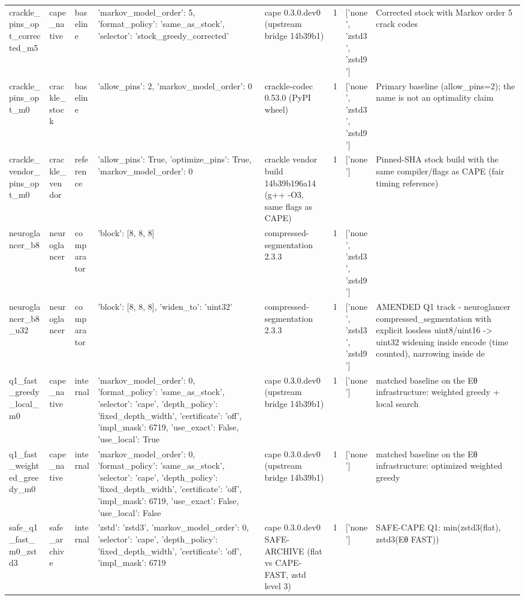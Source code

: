 \begin{table}[t]
\begin{tabular}{llllllll}
crackle\_pins\_opt\_corrected\_m5 & cape\_native & baseline & {'markov\_model\_order': 5, 'format\_policy': 'same\_as\_stock', 'selector': 'stock\_greedy\_corrected'} & cape 0.3.0.dev0 (upstream bridge 14b39b1) & 1 & ['none', 'zstd3', 'zstd9'] & Corrected stock with Markov order 5 crack codes \\
crackle\_pins\_opt\_m0 & crackle\_stock & baseline & {'allow\_pins': 2, 'markov\_model\_order': 0} & crackle-codec 0.53.0 (PyPI wheel) & 1 & ['none', 'zstd3', 'zstd9'] & Primary baseline (allow\_pins=2); the name is not an optimality claim \\
crackle\_vendor\_pins\_opt\_m0 & crackle\_vendor & reference & {'allow\_pins': True, 'optimize\_pins': True, 'markov\_model\_order': 0} & crackle vendor build 14b39b196a14 (g++ -O3, same flags as CAPE) & 1 & ['none'] & Pinned-SHA stock build with the same compiler/flags as CAPE (fair timing reference) \\
neuroglancer\_b8 & neuroglancer & comparator & {'block': [8, 8, 8]} & compressed-segmentation 2.3.3 & 1 & ['none', 'zstd3', 'zstd9'] &  \\
neuroglancer\_b8\_u32 & neuroglancer & comparator & {'block': [8, 8, 8], 'widen\_to': 'uint32'} & compressed-segmentation 2.3.3 & 1 & ['none', 'zstd3', 'zstd9'] & AMENDED Q1 track - neuroglancer compressed\_segmentation with explicit lossless uint8/uint16 -> uint32 widening inside encode (time counted), narrowing inside de \\
q1\_fast\_greedy\_local\_m0 & cape\_native & internal & {'markov\_model\_order': 0, 'format\_policy': 'same\_as\_stock', 'selector': 'cape', 'depth\_policy': 'fixed\_depth\_width', 'certificate': 'off', 'impl\_mask': 6719, 'use\_exact': False, 'use\_local': True} & cape 0.3.0.dev0 (upstream bridge 14b39b1) & 1 & ['none'] & matched baseline on the Eθ infrastructure: weighted greedy + local search \\
q1\_fast\_weighted\_greedy\_m0 & cape\_native & internal & {'markov\_model\_order': 0, 'format\_policy': 'same\_as\_stock', 'selector': 'cape', 'depth\_policy': 'fixed\_depth\_width', 'certificate': 'off', 'impl\_mask': 6719, 'use\_exact': False, 'use\_local': False} & cape 0.3.0.dev0 (upstream bridge 14b39b1) & 1 & ['none'] & matched baseline on the Eθ infrastructure: optimized weighted greedy \\
safe\_q1\_fast\_m0\_zstd3 & safe\_archive & internal & {'zstd': 'zstd3', 'markov\_model\_order': 0, 'selector': 'cape', 'depth\_policy': 'fixed\_depth\_width', 'certificate': 'off', 'impl\_mask': 6719} & cape 0.3.0.dev0 SAFE-ARCHIVE (flat vs CAPE-FAST, zstd level 3) & 1 & ['none'] & SAFE-CAPE Q1: min(zstd3(flat), zstd3(Eθ FAST)) \\

\end{tabular}
\end{table}
